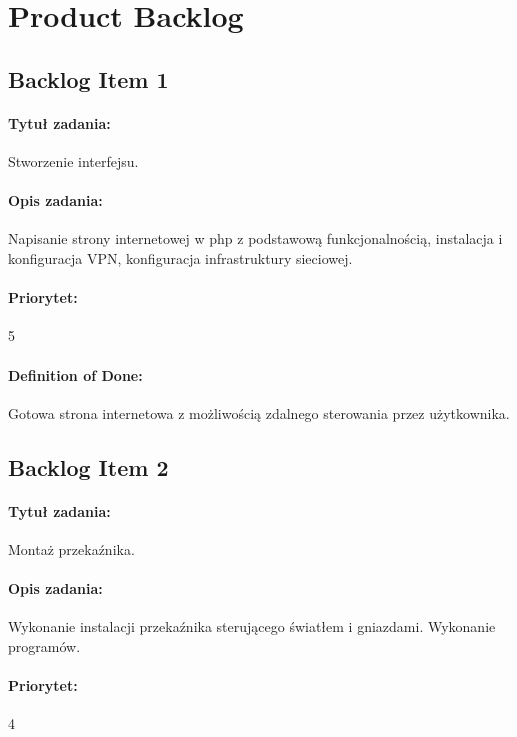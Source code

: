 \section{Product Backlog}

	\subsection{Backlog Item 1}
	\paragraph{Tytuł zadania:}
	Stworzenie interfejsu.
	
	\paragraph{Opis zadania:}
	Napisanie strony internetowej w php z podstawową funkcjonalnością, instalacja i konfiguracja VPN, konfiguracja infrastruktury sieciowej.
	
	\paragraph{Priorytet:}
	5
	
	\paragraph{Definition of Done:}
	Gotowa strona internetowa z możliwością zdalnego sterowania przez użytkownika.
	
	
	\subsection{Backlog Item 2}
	\paragraph{Tytuł zadania:} 
	Montaż przekaźnika.
	
	\paragraph{Opis zadania:} 
	Wykonanie instalacji przekaźnika sterującego światłem i gniazdami. Wykonanie programów.
	
	\paragraph{Priorytet:}
	4
	
